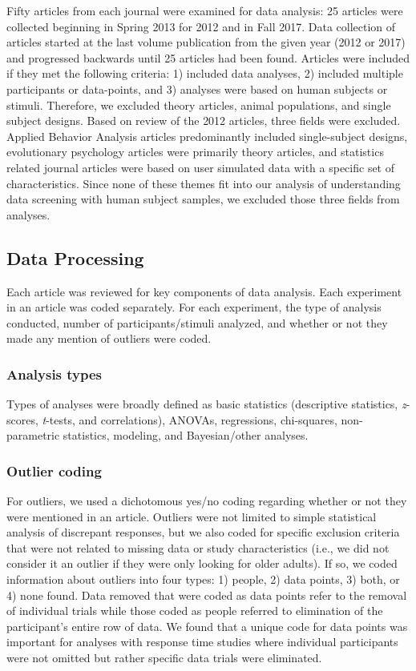 \documentclass[english,man]{apa6}
\theoremstyle{definition}
\theoremstyle{definition}
\theoremstyle{definition}
\theoremstyle{remark}
\begin{document}
Fifty articles from each journal were examined for data analysis: 25
articles were collected beginning in Spring 2013 for 2012 and in Fall
2017. Data collection of articles started at the last volume publication
from the given year (2012 or 2017) and progressed backwards until 25
articles had been found. Articles were included if they met the
following criteria: 1) included data analyses, 2) included multiple
participants or data-points, and 3) analyses were based on human
subjects or stimuli. Therefore, we excluded theory articles, animal
populations, and single subject designs. Based on review of the 2012
articles, three fields were excluded. Applied Behavior Analysis articles
predominantly included single-subject designs, evolutionary psychology
articles were primarily theory articles, and statistics related journal
articles were based on user simulated data with a specific set of
characteristics. Since none of these themes fit into our analysis of
understanding data screening with human subject samples, we excluded
those three fields from analyses.

\subsection{Data Processing}\label{data-processing}

Each article was reviewed for key components of data analysis. Each
experiment in an article was coded separately. For each experiment, the
type of analysis conducted, number of participants/stimuli analyzed, and
whether or not they made any mention of outliers were coded.

\subsubsection{Analysis types}\label{analysis-types}

Types of analyses were broadly defined as basic statistics (descriptive
statistics, \emph{z}-scores, \emph{t}-tests, and correlations), ANOVAs,
regressions, chi-squares, non-parametric statistics, modeling, and
Bayesian/other analyses.

\subsubsection{Outlier coding}\label{outlier-coding}

For outliers, we used a dichotomous yes/no coding regarding whether or
not they were mentioned in an article. Outliers were not limited to
simple statistical analysis of discrepant responses, but we also coded
for specific exclusion criteria that were not related to missing data or
study characteristics (i.e., we did not consider it an outlier if they
were only looking for older adults). If so, we coded information about
outliers into four types: 1) people, 2) data points, 3) both, or 4) none
found. Data removed that were coded as data points refer to the removal
of individual trials while those coded as people referred to elimination
of the participant's entire row of data. We found that a unique code for
data points was important for analyses with response time studies where
individual participants were not omitted but rather specific data trials
were eliminated.
\end{document}
